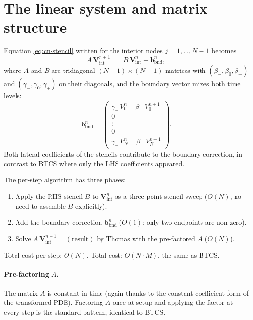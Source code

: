 \documentclass[11pt,a4paper]{article}
\begin{document}
\section{The linear system and matrix structure}

Equation \eqref{eq:cn-stencil} written for the interior nodes $j =
1, \dots, N-1$ becomes
\[
A\,\mathbf{V}^{n+1}_{\mathrm{int}}
\;=\; B\,\mathbf{V}^n_{\mathrm{int}}
   + \mathbf{b}_{\mathrm{bnd}}^n,
\]
where $A$ and $B$ are tridiagonal $(N-1)\times(N-1)$ matrices with
$(\beta_-, \beta_0, \beta_+)$ and $(\gamma_-, \gamma_0, \gamma_+)$ on
their diagonals, and the boundary vector mixes both time levels:
\begin{equation}
\mathbf{b}_{\mathrm{bnd}}^n
= \begin{pmatrix}
\gamma_-\,V_0^n - \beta_-\,V_0^{n+1} \\
0 \\
\vdots \\
0 \\
\gamma_+\,V_N^n - \beta_+\,V_N^{n+1}
\end{pmatrix}.
\label{eq:bnd-cn}
\end{equation}
Both lateral coefficients of the stencils contribute to the boundary
correction, in contrast to BTCS where only the LHS coefficients
appeared.

The per-step algorithm has three phases:
\begin{enumerate}[leftmargin=2em]
\item Apply the RHS stencil $B$ to $\mathbf{V}^n_{\mathrm{int}}$ as
a three-point stencil sweep ($O(N)$, no need to assemble $B$
explicitly).
\item Add the boundary correction $\mathbf{b}_{\mathrm{bnd}}^n$
($O(1)$: only two endpoints are non-zero).
\item Solve $A\,\mathbf{V}^{n+1}_{\mathrm{int}} = (\text{result})$ by
Thomas with the pre-factored $A$ ($O(N)$).
\end{enumerate}
Total cost per step: $O(N)$. Total cost: $O(N \cdot M)$, the same
as BTCS.

\paragraph{Pre-factoring $A$.} The matrix $A$ is constant in time
(again thanks to the constant-coefficient form of the transformed
PDE). Factoring $A$ once at setup and applying the factor at every
step is the standard pattern, identical to BTCS.
\end{document}
